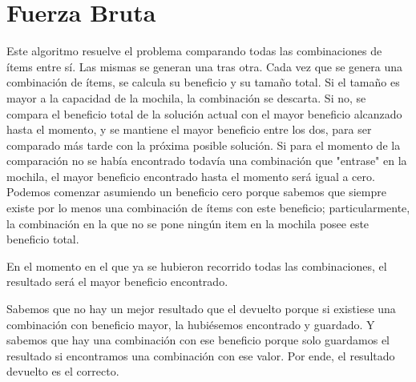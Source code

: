 \documentclass[10pt, a4paper]{article}
\begin{document}
\section{Fuerza Bruta}
Este algoritmo resuelve el problema comparando todas las combinaciones de ítems entre sí.
Las mismas se generan una tras otra. Cada vez que se genera una combinación de ítems, se calcula su beneficio y su tamaño total. Si el tamaño es mayor a la capacidad de la mochila, la combinación se descarta. Si no, se compara el beneficio total de la solución actual con el mayor beneficio alcanzado hasta el momento, y se mantiene el mayor beneficio entre los dos, para ser comparado más tarde con la próxima posible solución. Si para el momento de la comparación no se había encontrado todavía una combinación que "entrase" en la mochila, el mayor beneficio encontrado hasta el momento será igual a cero. Podemos comenzar asumiendo un beneficio cero porque sabemos que siempre existe por lo menos una combinación de ítems con este beneficio; particularmente, la combinación en la que no se pone ningún item en la mochila posee este beneficio total.\par
En el momento en el que ya se hubieron recorrido todas las combinaciones, el resultado será el mayor beneficio encontrado. \par

Sabemos que no hay un mejor resultado que el devuelto porque si existiese una combinación con beneficio mayor, la hubiésemos encontrado y guardado. Y sabemos que hay una combinación con ese beneficio porque solo guardamos el resultado si encontramos una combinación con ese valor. Por ende, el resultado devuelto es el correcto.



\end{document}
